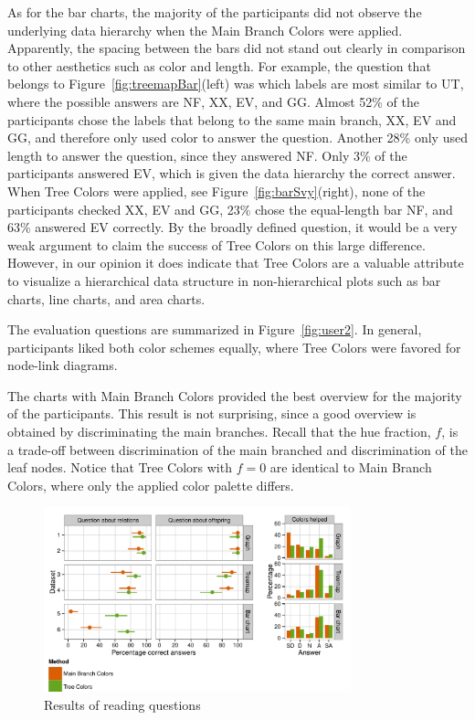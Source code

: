 \documentclass[review,journal]{vgtc}         %
\begin{document}
As for the bar charts, the majority of the participants did not observe the underlying data hierarchy when the Main Branch Colors were applied. Apparently, the spacing between the bars did not stand out clearly in comparison to other aesthetics such as color and length. For example, the question that belongs to Figure~\ref{fig:treemapBar}(left) was which labels are most similar to UT, where the possible answers are NF, XX, EV, and GG. Almost 52\% of the participants chose the labels that belong to the same main branch, XX, EV and GG, and therefore only used color to answer the question. Another 28\% only used length to answer the question, since they answered NF. Only 3\% of the participants answered EV, which is given the data hierarchy the correct answer. When Tree Colors were applied, see Figure~\ref{fig:barSvy}(right), none of the participants checked XX, EV and GG, 23\% chose the equal-length bar NF, and 63\% answered EV correctly. By the broadly defined question, it would be a very weak argument to claim the success of Tree Colors on this large difference. However, in our opinion it does indicate that Tree Colors are a valuable attribute to visualize a hierarchical data structure in non-hierarchical plots such as bar charts, line charts, and area charts.

The evaluation questions are summarized in Figure~\ref{fig:user2}. In general, participants liked both color schemes equally, where Tree Colors were favored for node-link diagrams.

The charts with Main Branch Colors provided the best overview for the majority of the participants. This result is not surprising, since a good overview is obtained by discriminating the main branches. 
Recall that the hue fraction, $f$, is a trade-off between discrimination of the main branched and discrimination of the leaf nodes. Notice that Tree Colors with $f=0$ are identical to Main Branch Colors, where only the applied color palette differs.

\begin{figure}[tb]
  \centering
	\includegraphics[width=3.5in]{user_study_results_mod2.pdf}
  \caption{Results of reading questions}\label{fig:user1}
\end{figure}
\end{document}
